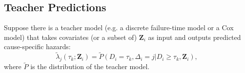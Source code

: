 \documentclass{article}
\theoremstyle{plain}
\theoremstyle{definition}
\theoremstyle{remark}
\begin{document}
\subsection{Teacher Predictions} \label{section: External}
Suppose there is a teacher model (e.g. a discrete failure-time model or a Cox model) that takes covariates (or a subset of) $\bm{Z}_i$ as input and outputs predicted cause-specific hazards: 
\begin{equation*}
    \tilde{\lambda}_j(\tau_k;\bm{Z}_{i}) = \tilde{P}(D_i = \tau_k, \Delta_i = j|D_i\geq\tau_k,\bm{Z}_i),
\end{equation*}
where $\tilde{P}$ is the distribution of the teacher model. %
\end{document}
